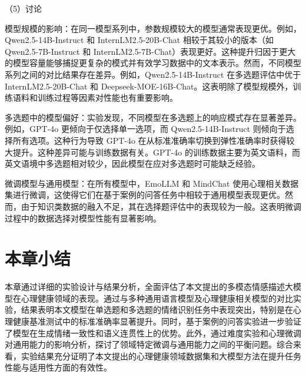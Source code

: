 （5）讨论

模型规模的影响：在同一模型系列中，参数规模较大的模型通常表现更优。例如，Qwen2.5-14B-Instruct 和 InternLM2.5-20B-Chat 相较于其较小的版本（如 Qwen2.5-7B-Instruct 和 InternLM2.5-7B-Chat）表现更好。这种提升归因于更大的模型容量能够捕捉更复杂的模式并有效学习数据中的文本表示。然而，不同模型系列之间的对比结果存在差异。例如，Qwen2.5-14B-Instruct 在多选题评估中优于 InternLM2.5-20B-Chat 和 Deepseek-MOE-16B-Chat。这表明除了模型规模外，训练语料和训练过程等因素对性能也有重要影响。

多选题中的模型偏好：实验发现，不同模型在多选题上的响应模式存在显著差异。例如，GPT-4o 更倾向于仅选择单一选项，而 Qwen2.5-14B-Instruct 则倾向于选择所有选项。这种行为导致 GPT-4o 在从标准准确率切换到弹性准确率时获得较大提升。这种差异可能与训练数据有关。GPT-4o 的训练数据主要为英文语料，而英文语境中多选题相对较少，因此模型在应对多选题时可能缺乏经验。

微调模型与通用模型：在所有模型中，EmoLLM 和 MindChat 使用心理相关数据集进行微调，这使得它们在基于案例的问答任务中相较于通用模型表现更优。然而，由于知识类数据的融入不足，其在选择题评估中的表现较为一般。这表明微调过程中的数据选择对模型性能有显著影响。

\section{本章小结}

本章通过详细的实验设计与结果分析，全面评估了本文提出的多模态情感描述大模型在心理健康领域的表现。通过与多种通用语言模型及心理健康相关模型的对比实验，结果表明本文模型在单选题和多选题的情绪识别任务中表现突出，特别是在心理健康基准测试中的标准准确率显著提升。同时，基于案例的问答实验进一步验证了模型在生成情绪一致性和语义连贯性上的优势。此外，通过难度实验和心理微调对通用能力的影响分析，探讨了领域特定微调与通用能力之间的平衡问题。综合来看，实验结果充分证明了本文提出的心理健康领域数据集和大模型方法在提升任务性能与适用性方面的有效性。
